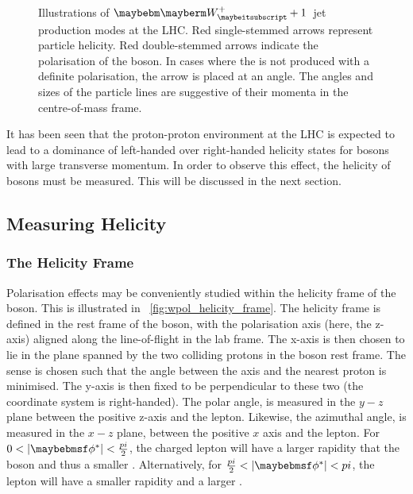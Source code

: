 \begin{figure}
\centering
{}\quad
{}\quad
{}\\
\quad
{}\quad
{}
\caption[Illustrations of $\PWplus+1$~jet production modes at the
\acs{LHC}]{Illustrations of $\PWplus+1$~jet production modes at the LHC. Red
  single-stemmed arrows represent particle helicity. Red double-stemmed arrows
  indicate the polarisation of the \PW boson. In cases where the \PW is not
  produced with a definite polarisation, the arrow is placed at an angle. The
  angles and sizes of the particle lines are suggestive of their momenta in the
  centre-of-mass frame.}
\label{fig:w1jet_modes}
\end{figure}

It has been seen that the proton-proton environment at the \ac{LHC} is expected
to lead to a dominance of left-handed over right-handed helicity states for \PW
bosons with large transverse momentum. In order to observe this effect, the
helicity of \PW bosons must be measured. This will be discussed in the next section.

\subsection{Measuring Helicity}
\subsubsection{The Helicity Frame}
Polarisation effects may be conveniently studied within the helicity frame of
the \PW boson. This is illustrated in \fig~\ref{fig:wpol_helicity_frame}. The
helicity frame is defined in the rest frame of the \PW boson, with the
polarisation axis (here, the z-axis) aligned along the \PW line-of-flight in the
lab frame. The x-axis is then chosen to lie in the plane spanned by the two
colliding protons in the boson rest frame. The sense is chosen such that the
angle between the axis and the nearest proton is minimised. The y-axis is then
fixed to be perpendicular to these two (the coordinate system is
right-handed). The polar angle, \thetastar is measured in the $y-z$ plane
between the positive z-axis and the lepton. Likewise, the azimuthal angle,
\phistar is measured in the $x-z$ plane, between the positive $x$ axis and the
lepton. For $0 < |\phistar| < \frac{\pi}{2}$, the charged lepton will have a
larger rapidity that the \PW boson and thus a smaller \Pt. Alternatively, for
$\frac{\pi}{2} < |\phistar| < \pi$, the lepton will have a smaller rapidity and
a larger \Pt.

